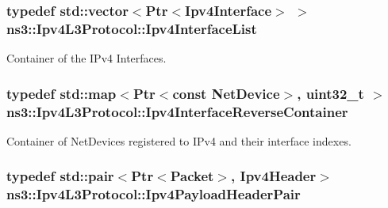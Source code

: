 \subsubsection[{\texorpdfstring{Ipv4\+Interface\+List}{Ipv4InterfaceList}}]{\setlength{\rightskip}{0pt plus 5cm}typedef std\+::vector$<${\bf Ptr}$<${\bf Ipv4\+Interface}$>$ $>$ {\bf ns3\+::\+Ipv4\+L3\+Protocol\+::\+Ipv4\+Interface\+List}\hspace{0.3cm}{\ttfamily [private]}}\hypertarget{classns3_1_1Ipv4L3Protocol_ada31b7e1708bfe1fb99a44f5c4f3271f}{}\label{classns3_1_1Ipv4L3Protocol_ada31b7e1708bfe1fb99a44f5c4f3271f}


Container of the I\+Pv4 Interfaces. 

\subsubsection[{\texorpdfstring{Ipv4\+Interface\+Reverse\+Container}{Ipv4InterfaceReverseContainer}}]{\setlength{\rightskip}{0pt plus 5cm}typedef std\+::map$<${\bf Ptr}$<$const {\bf Net\+Device}$>$, uint32\+\_\+t $>$ {\bf ns3\+::\+Ipv4\+L3\+Protocol\+::\+Ipv4\+Interface\+Reverse\+Container}\hspace{0.3cm}{\ttfamily [private]}}\hypertarget{classns3_1_1Ipv4L3Protocol_a6fdb18e99c2052467dcb9079673f9764}{}\label{classns3_1_1Ipv4L3Protocol_a6fdb18e99c2052467dcb9079673f9764}


Container of Net\+Devices registered to I\+Pv4 and their interface indexes. 

\subsubsection[{\texorpdfstring{Ipv4\+Payload\+Header\+Pair}{Ipv4PayloadHeaderPair}}]{\setlength{\rightskip}{0pt plus 5cm}typedef std\+::pair$<${\bf Ptr}$<${\bf Packet}$>$, {\bf Ipv4\+Header}$>$ {\bf ns3\+::\+Ipv4\+L3\+Protocol\+::\+Ipv4\+Payload\+Header\+Pair}\hspace{0.3cm}{\ttfamily [private]}}\hypertarget{classns3_1_1Ipv4L3Protocol_a2bf61de1f7739b9ce8b1dac10fb14b31}{}\label{classns3_1_1Ipv4L3Protocol_a2bf61de1f7739b9ce8b1dac10fb14b31}


